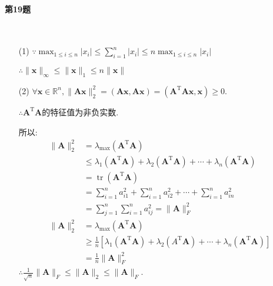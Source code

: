 \documentclass[a4paper]{article}
\begin{document}
\paragraph{第19题}~{}
\\
\begin{enumerate}
    \item [(1)]
    $\because
        \max_{1 \leq i \leq n} |x_i| \leq \sum_{i=1}^{n} |x_i| \leq n\max_{1 \leq i \leq n} |x_i| 
    $ \par
    $\therefore \|\boldsymbol{x}\|_{\infty} \leqslant\|\boldsymbol{x}\|_{1} \leqslant n\|\boldsymbol{x}\|$
    \item [(2)]
    $\forall \boldsymbol{x} \in \mathbb{R}^n, \|\boldsymbol{A} \boldsymbol{x}\|_{2}^{2} = (\boldsymbol{A} \boldsymbol{x}, \boldsymbol{A} \boldsymbol{x}) = (\boldsymbol{A}^{\mathrm{T}} \boldsymbol{A} \boldsymbol{x}, \boldsymbol{x}) \geq 0$. \par
    $\therefore \boldsymbol{A}^{\mathrm{T}} \boldsymbol{A}$的特征值为非负实数. \par
    所以:
    \begin{equation}
        \begin{aligned}\|\boldsymbol{A}\|_{2}^{2} & =\lambda_{\max }\left(\boldsymbol{A}^{\mathrm{T}} \boldsymbol{A}\right) \\ & \leqslant \lambda_{1}\left(\boldsymbol{A}^{\mathrm{T}} \boldsymbol{A}\right)+\lambda_{2}\left(\boldsymbol{A}^{\mathrm{T}} \boldsymbol{A}\right)+\cdots+\lambda_{n}\left(\boldsymbol{A}^{\mathrm{T}} \boldsymbol{A}\right) \\ & =\operatorname{tr}\left(\boldsymbol{A}^{\mathrm{T}} \boldsymbol{A}\right) \\ & =\sum_{i=1}^{n} a_{i 1}^{2}+\sum_{i=1}^{n} a_{i 2}^{2}+\cdots+\sum_{i=1}^{n} a_{i n}^{2} \\ & =\sum_{j=1}^{n} \sum_{i=1}^{n} a_{i j}^{2}=\|\boldsymbol{A}\|_{F}^{2} \\ \|\boldsymbol{A}\|_{2}^{2} & =\lambda_{\max }\left(\boldsymbol{A}^{\mathrm{T}} \boldsymbol{A}\right) \\ & \geqslant \frac{1}{n}\left[\lambda_1\left(\boldsymbol{A}^{\mathrm{T}} \boldsymbol{A}\right)+\lambda_{2}\left(A^{\mathrm{T}} \boldsymbol{A}\right)+\cdots+\lambda_{n}\left(\boldsymbol{A}^{\mathrm{T}} \boldsymbol{A}\right)\right] \\ & =\frac{1}{n}\|\boldsymbol{A}\|_{F}^{2}\end{aligned} \nonumber
    \end{equation}
    $\therefore \frac{1}{\sqrt{n}}\|\boldsymbol{A}\|_{F} \leqslant\|\boldsymbol{A}\|_{2} \leqslant\|\boldsymbol{A}\|_{F}$.
\end{enumerate}
\end{document}
